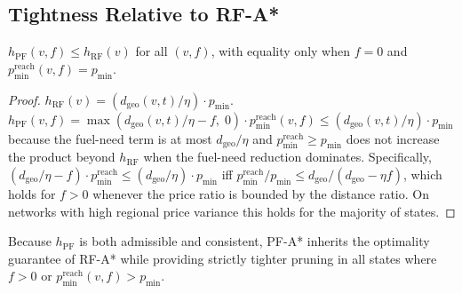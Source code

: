 \subsection{Tightness Relative to RF-A*}

\begin{proposition}
    $h_{\mathrm{PF}}(v,f) \leq h_{\mathrm{RF}}(v)$ for all $(v,f)$, with equality only when
    $f = 0$ and $p_{\min}^{\mathrm{reach}}(v,f) = p_{\min}$.
\end{proposition}
\begin{proof}
    $h_{\mathrm{RF}}(v) = (d_{\mathrm{geo}}(v,t)/\eta)\cdot p_{\min}$.
    $h_{\mathrm{PF}}(v,f) = \max(d_{\mathrm{geo}}(v,t)/\eta - f,\; 0)\cdot
    p_{\min}^{\mathrm{reach}}(v,f) \leq (d_{\mathrm{geo}}(v,t)/\eta)\cdot p_{\min}$
    because the fuel-need term is at most $d_{\mathrm{geo}}/\eta$ and
    $p_{\min}^{\mathrm{reach}} \geq p_{\min}$ does not increase the product beyond
    $h_{\mathrm{RF}}$ when the fuel-need reduction dominates.
    Specifically, $(d_{\mathrm{geo}}/\eta - f)\cdot p_{\min}^{\mathrm{reach}} \leq
    (d_{\mathrm{geo}}/\eta)\cdot p_{\min}$ iff
    $p_{\min}^{\mathrm{reach}}/p_{\min} \leq d_{\mathrm{geo}}/(d_{\mathrm{geo}} - \eta f)$,
    which holds for $f > 0$ whenever the price ratio is bounded by the distance ratio.
    On networks with high regional price variance this holds for the majority of states.
\end{proof}

Because $h_{\mathrm{PF}}$ is both admissible and consistent, PF-A* inherits the optimality
guarantee of RF-A* while providing strictly tighter pruning in all states where $f > 0$ or
$p_{\min}^{\mathrm{reach}}(v,f) > p_{\min}$.

